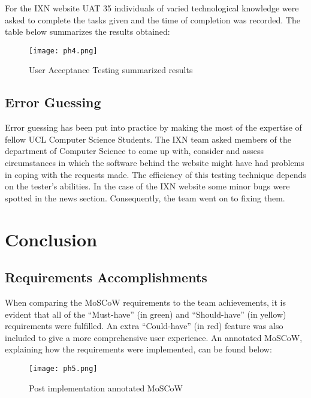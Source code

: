 For the IXN website UAT 35 individuals of varied technological knowledge
were asked to complete the tasks given and the time of completion was
recorded. The table below summarizes the results obtained:

\begin{figure}[H]
      \centering
      \texttt{[image: ph4.png]}
      \caption{User Acceptance Testing summarized results}
 \end{figure}

\hypertarget{error-guessing}{%
\subsection{Error Guessing}\label{error-guessing}}

Error guessing has been put into practice by making the most of the
expertise of fellow UCL Computer Science Students. The IXN team asked
members of the department of Computer Science to come up with, consider
and assess circumstances in which the software behind the website might
have had problems in coping with the requests made. The efficiency of
this testing technique depends on the tester's abilities. In the case of
the IXN website some minor bugs were spotted in the news section.
Consequently, the team went on to fixing them.

\hypertarget{conclusion}{%
\section{Conclusion}\label{conclusion}}

\hypertarget{requirements-accomplishments}{%
\subsection{Requirements
Accomplishments}\label{requirements-accomplishments}}

When comparing the MoSCoW requirements to the team achievements, it is
evident that all of the ``Must-have'' (in green) and ``Should-have'' (in
yellow) requirements were fulfilled. An extra ``Could-have'' (in red)
feature was also included to give a more comprehensive user experience.
An annotated MoSCoW, explaining how the requirements were implemented,
can be found below:

\begin{figure}[H]
      \centering
      \texttt{[image: ph5.png]}
      \caption{Post implementation annotated MoSCoW}
 \end{figure}

